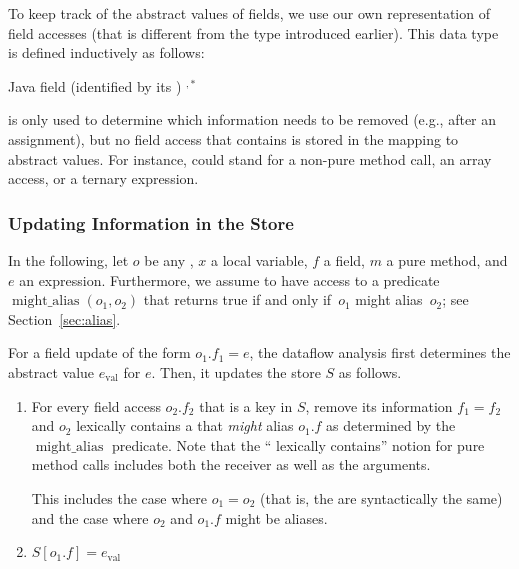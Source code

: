 To keep track of the abstract values of fields, we use our own representation
of field accesses
(that is different from the  type introduced earlier).  This
data type is defined inductively as follows:

\begin{bnfgrammar}
        {  \qquad Java field (identified by its )}
        { \qquad {}}
        {  
            \literal{(} $^{,*}$ \literal{)}}
\end{bnfgrammar}

 is only used to determine which
information needs to be removed (e.g., after an assignment), but no field
access that contains  is stored in the mapping to
abstract values.  For instance,  could stand for
a non-pure method call, an array access, or a ternary expression.


\subsubsection{Updating Information in the Store}

\newcommand{\alias}{\operatorname{might\_alias}}

In the following, let $o$ be any ,
$x$ a local variable, $f$ a
field, $m$ a pure method, and $e$ an expression.  Furthermore, we assume to have access to
a predicate $\alias(o_1,o_2)$ that returns true if and only
if~$o_1$ might alias~$o_2$; see Section~\ref{sec:alias}.


For a field update of the form $o_1.f_1 = e$, the
dataflow analysis first determines the abstract value $e_\text{val}$ for $e$.
Then, it updates the store $S$ as follows.
\begin{enumerate}
    \item For every field access $o_2.f_2$ that is a key in $S$, remove its
      information $f_1 = f_2$ and 
      $o_2$ lexically contains a  that \emph{might}
        alias $o_1.f$ as determined by the $\alias$
        predicate.
      Note that the `` lexically contains'' notion for pure method calls
        includes both the receiver as well as the arguments.

      This includes the case where $o_1 = o_2$ (that is, the are
      syntactically the same) and the case where  $o_2$ and $o_1.f$ might be
      aliases.

    \item $S[o_1.f] = e_\text{val}$
\end{enumerate}


